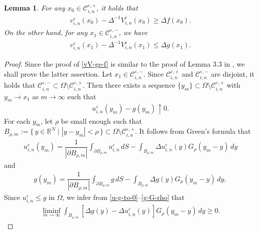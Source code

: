 \documentclass[12pt]{amsart}
\newtheorem{lem}{Lemma}[section]
\begin{document}
\begin{lem} \label{version-est}
For any $x_0 \in {\mathcal{C}}^{{\varepsilon},+}_{i,n}$, it holds that 
\begin{align} \label{vV-ge-f}
v^{\varepsilon}_{i,n}(x_0) - \Delta^{-1} V^{\varepsilon}_{i,n}(x_0) \ge \Delta f(x_0). 
\end{align}
On the other hand, for any $x_1 \in {\mathcal{C}}^{{\varepsilon},-}_{i,n}$, we have 
\begin{align} \label{vV-le-g}
v^{\varepsilon}_{i,n}(x_1) - \Delta^{-1} V^{\varepsilon}_{i,n}(x_1) \le \Delta g(x_1). 
\end{align}
\end{lem}
\begin{proof}
Since the proof of \eqref{vV-ge-f} is similar to the proof of Lemma 3.3 in \cite{NO}, we shall prove the latter assertion.  
Let $x_{1} \in {\mathcal{C}}^{{\varepsilon},-}_{i,n}$. 
Since ${\mathcal{C}}^{{\varepsilon},+}_{i,n}$ and ${\mathcal{C}}^{{\varepsilon},-}_{i,n}$ are disjoint, it holds that ${\mathcal{C}}^{{\varepsilon},-}_{i,n} \subset \Omega \setminus {\mathcal{C}}^{{\varepsilon},+}_{i,n}$. 
Then there exists a sequence $\{ y_{m} \} \subset \Omega \setminus {\mathcal{C}}^{{\varepsilon},+}_{i,n}$ with $y_{m} \to x_{1}$ as $m \to \infty$ such that 
\begin{align} \label{u-g-to-0}
u^{\varepsilon}_{i,n}(y_{m}) - g(y_{m}) \uparrow 0 . 
\end{align}
For each $y_{m}$, let $\rho$ be small enough such that 
$B_{\rho,m}:= \{\, y \in {\mathbb{R}}^{N} \mid | y - y_{m} |< \rho \,\} \subset \Omega \setminus {\mathcal{C}}^{{\varepsilon},+}_{i,n}$. 
It follows from Green's formula that 
\begin{align}
u^{\varepsilon}_{i,n}(y_{m}) = \dfrac{1}{| {\partial} B_{\rho,m}| } \int_{{\partial} B_{\rho,m}} u^{\varepsilon}_{i,n} \, dS 
   - \int_{B_{\rho,m}} \Delta u^{\varepsilon}_{i,n}(y) G_{\rho}(y_{m}-y)\, dy 
\end{align}
and 
\begin{align}\label{g-G-rho}
g(y_{m}) = \dfrac{1}{| {\partial} B_{\rho,m}| } \int_{{\partial} B_{\rho,m}} g \, dS 
   - \int_{B_{\rho,m}} \Delta g(y) G_{\rho}(y_{m}-y)\, dy, 
\end{align}
Since $u^{\varepsilon}_{i,n} \le g$ in $\Omega$, we infer from \eqref{u-g-to-0}--\eqref{g-G-rho} that 
\begin{align*}
\liminf_{m \to \infty} \int_{B_{\rho,m}} \left[ \Delta g(y) - \Delta u^{\varepsilon}_{i,n}(y) \right] G_{\rho}(y_{m}-y) \, dy \ge 0. 
\end{align*}

\end{proof}
\end{document}
